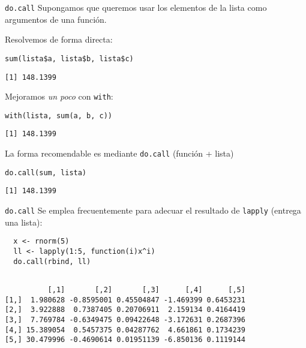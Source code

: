 \documentclass[xcolor={usenames,svgnames,dvipsnames}]{beamer}
\begin{document}
\begin{frame}[label={sec:orga29c1f0},fragile]{\texttt{do.call}}
 Supongamos que queremos usar los elementos de la lista como argumentos de una función.

Resolvemos de forma directa:
\lstset{language=r,label= ,caption= ,captionpos=b,numbers=none}
\begin{lstlisting}
sum(lista$a, lista$b, lista$c)
\end{lstlisting}

\begin{verbatim}
[1] 148.1399
\end{verbatim}


Mejoramos \emph{un poco} con \texttt{with}:
\lstset{language=r,label= ,caption= ,captionpos=b,numbers=none}
\begin{lstlisting}
with(lista, sum(a, b, c))
\end{lstlisting}

\begin{verbatim}
[1] 148.1399
\end{verbatim}


La forma recomendable es mediante \texttt{do.call} (función + lista)
\lstset{language=r,label= ,caption= ,captionpos=b,numbers=none}
\begin{lstlisting}
do.call(sum, lista)
\end{lstlisting}

\begin{verbatim}
[1] 148.1399
\end{verbatim}
\end{frame}

\begin{frame}[label={sec:org4001958},fragile]{\texttt{do.call}}
 Se emplea frecuentemente para adecuar el resultado de \texttt{lapply} (entrega una lista):
\lstset{language=r,label= ,caption= ,captionpos=b,numbers=none}
\begin{lstlisting}
  x <- rnorm(5)
  ll <- lapply(1:5, function(i)x^i)
  do.call(rbind, ll)
\end{lstlisting}

\begin{verbatim}

          [,1]       [,2]       [,3]      [,4]      [,5]
[1,]  1.980628 -0.8595001 0.45504847 -1.469399 0.6453231
[2,]  3.922888  0.7387405 0.20706911  2.159134 0.4164419
[3,]  7.769784 -0.6349475 0.09422648 -3.172631 0.2687396
[4,] 15.389054  0.5457375 0.04287762  4.661861 0.1734239
[5,] 30.479996 -0.4690614 0.01951139 -6.850136 0.1119144
\end{verbatim}
\end{frame}
\end{document}
